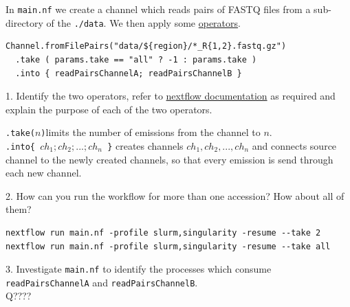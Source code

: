 \begin{questions}
In \texttt{main.nf} we create a channel which reads pairs of FASTQ files from a sub-directory of the \texttt{./data}. We then apply some \href{https://www.nextflow.io/docs/latest/operator.html}{operators}. 
\begin{verbatim}
Channel.fromFilePairs("data/${region}/*_R{1,2}.fastq.gz")
  .take ( params.take == "all" ? -1 : params.take ) 
  .into { readPairsChannelA; readPairsChannelB } 
\end{verbatim}
1. Identify the two operators, refer to \href{https://www.nextflow.io/docs/latest/operator.html}{nextflow documentation} as required and explain the purpose of each of the two operators.\\
\begin{answer}
\texttt{.take($n$)}limits the number of emissions from the channel to $n$. \\
\texttt{.into\{ $ch_1;ch_2;...;ch_n$ \}} creates channels $ch_1,ch_2,...,ch_n$ and connects source channel to the newly created channels, so that every emission is send through each new channel.
\end{answer}

2. How can you run the workflow for more than one accession? How about all of them?
\begin{answer}
\begin{lstlisting}
nextflow run main.nf -profile slurm,singularity -resume --take 2
nextflow run main.nf -profile slurm,singularity -resume --take all
\end{lstlisting}
\end{answer}

3. Investigate \texttt{main.nf} to identify the processes which consume \texttt{readPairsChannelA} and \texttt{readPairsChannelB}. \\

Q????

\end{questions}


